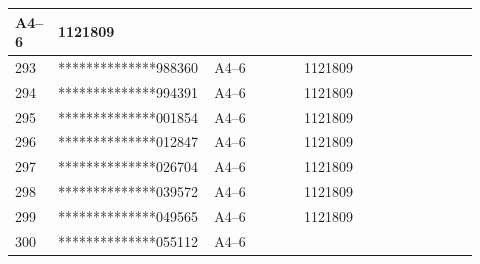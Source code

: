 \documentclass[UTF8,10pt,a4paper,fontset=fandol]{ctexart}
\newcommand{\fieldvalue}[1]{#1}
\begin{document}
\begin{tabular}{|p{0.08\linewidth}|p{0.28\linewidth}|p{0.19\linewidth}|p{0.19\linewidth}|p{0.18\linewidth}|}
\fieldvalue{A4--6} &
\fieldvalue{1121809} & \\ \hline
293 &
\fieldvalue{**************988360} &
\fieldvalue{A4--6} &
\fieldvalue{1121809} & \\ \hline
294 &
\fieldvalue{**************994391} &
\fieldvalue{A4--6} &
\fieldvalue{1121809} & \\ \hline
295 &
\fieldvalue{**************001854} &
\fieldvalue{A4--6} &
\fieldvalue{1121809} & \\ \hline
296 &
\fieldvalue{**************012847} &
\fieldvalue{A4--6} &
\fieldvalue{1121809} & \\ \hline
297 &
\fieldvalue{**************026704} &
\fieldvalue{A4--6} &
\fieldvalue{1121809} & \\ \hline
298 &
\fieldvalue{**************039572} &
\fieldvalue{A4--6} &
\fieldvalue{1121809} & \\ \hline
299 &
\fieldvalue{**************049565} &
\fieldvalue{A4--6} &
\fieldvalue{1121809} & \\ \hline
300 &
\fieldvalue{**************055112} &
\fieldvalue{A4--6} &

\end{tabular}
\end{document}
